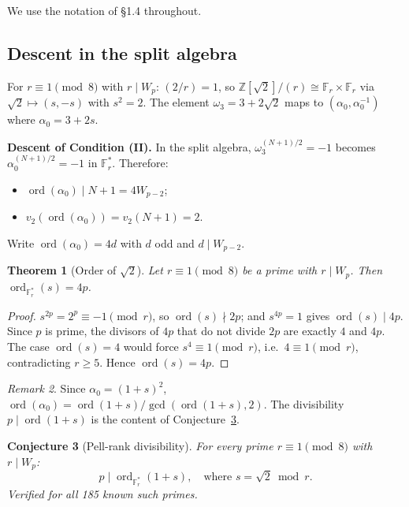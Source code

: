 \documentclass[12pt]{article}
\theoremstyle{plain}
\newtheorem{theorem}{Theorem}[section]
\newtheorem{conjecture}[theorem]{Conjecture}
\theoremstyle{definition}
\theoremstyle{remark}
\newtheorem{remark}[theorem]{Remark}
\begin{document}
We use the notation of \S1.4 throughout.

\subsection{Descent in the split algebra}


For \(r \equiv 1 \pmod{8}\) with \(r \mid W_p\): \((2/r) = 1\), so
\(\mathbb{Z}[\sqrt{2}]/(r) \cong \mathbb{F}_r \times \mathbb{F}_r\)
via \(\sqrt{2} \mapsto (s, -s)\) with \(s^2 = 2\). The element
\(\omega_3 = 3+2\sqrt{2}\) maps to \((\alpha_0, \alpha_0^{-1})\)
where \(\alpha_0 = 3+2s\).

\textbf{Descent of Condition (II).} In the split algebra,
\(\omega_3^{(N+1)/2} = -1\) becomes \(\alpha_0^{(N+1)/2} = -1\)
in \(\mathbb{F}_r^*\). Therefore:
\begin{itemize}
\item \(\operatorname{ord}(\alpha_0) \mid N+1 = 4W_{p-2}\);
\item \(v_2(\operatorname{ord}(\alpha_0)) = v_2(N+1) = 2\).
\end{itemize}

Write \(\operatorname{ord}(\alpha_0) = 4d\) with \(d\) odd and
\(d \mid W_{p-2}\).

\begin{theorem}[{Order of $\sqrt{2}$}]\label{thm:ord-sqrt2}
Let \(r \equiv 1 \pmod{8}\)
be a prime with \(r \mid W_p\). Then
\(\operatorname{ord}_{\mathbb{F}_r^*}(s) = 4p\).
\end{theorem}


\begin{proof}
\(s^{2p} = 2^p \equiv -1 \pmod{r}\), so
\(\operatorname{ord}(s) \nmid 2p\); and \(s^{4p} = 1\) gives
\(\operatorname{ord}(s) \mid 4p\). Since \(p\) is prime, the
divisors of \(4p\) that do not divide \(2p\) are exactly \(4\) and
\(4p\). The case \(\operatorname{ord}(s) = 4\) would force
\(s^4 \equiv 1 \pmod r\), i.e.\ \(4 \equiv 1 \pmod r\), contradicting
\(r \geq 5\). Hence \(\operatorname{ord}(s) = 4p\).\end{proof}


\begin{remark}
Since \(\alpha_0 = (1+s)^2\),
\(\operatorname{ord}(\alpha_0) =
\operatorname{ord}(1+s)/\gcd(\operatorname{ord}(1+s), 2)\).
The divisibility \(p \mid \operatorname{ord}(1+s)\) is the content
of Conjecture~\ref{conj:R3}.
\end{remark}

\begin{conjecture}[Pell-rank divisibility]\label{conj:R3}
For every prime \(r \equiv 1 \pmod{8}\) with
\(r \mid W_p\):
\[
p \mid \operatorname{ord}_{\mathbb{F}_r^*}(1+s),
\quad\text{where } s = \sqrt{2} \bmod r.
\]
Verified for all 185 known such primes.
\end{conjecture}
\end{document}

